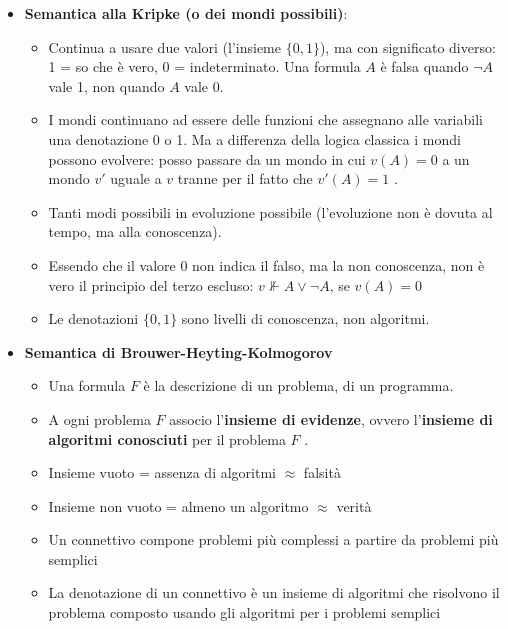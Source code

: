 \documentclass[
  a4paper,
]{article}
\providecommand{\tightlist}{%
  \setlength{\itemsep}{0pt}\setlength{\parskip}{0pt}}
\begin{document}
\begin{itemize}
\item
  \textbf{Semantica alla Kripke (o dei mondi possibili)}:

  \begin{itemize}
  \tightlist
  \item
    Continua a usare due valori (l'insieme \(\{0, 1\}\)), ma con
    significato diverso: 1 = so che è vero, 0 = indeterminato. Una
    formula \(A\) è falsa quando \(\neg A\) vale 1, non quando \(A\)
    vale 0.
  \item
    I mondi continuano ad essere delle funzioni che assegnano alle
    variabili una denotazione 0 o 1. Ma a differenza della logica
    classica i mondi possono evolvere: posso passare da un mondo in cui
    \(v(A) = 0\) a un mondo \(v'\) uguale a \(v\) tranne per il fatto
    che \(v'(A) = 1\) .
  \item
    Tanti modi possibili in evoluzione possibile (l'evoluzione non è
    dovuta al tempo, ma alla conoscenza).
  \item
    Essendo che il valore 0 non indica il falso, ma la non conoscenza,
    non è vero il principio del terzo escluso:
    \(v \not \Vdash A \lor \neg A\), se \(v(A) = 0\)
  \item
    Le denotazioni \(\{0, 1\}\) sono livelli di conoscenza, non
    algoritmi.
  \end{itemize}
\item
  \textbf{Semantica di Brouwer-Heyting-Kolmogorov}

  \begin{itemize}
  \tightlist
  \item
    Una formula \(F\) è la descrizione di un problema, di un programma.
  \item
    A ogni problema \(F\) associo l'\textbf{insieme di evidenze}, ovvero
    l'\textbf{insieme di algoritmi conosciuti} per il problema \(F\) .
  \item
    Insieme vuoto = assenza di algoritmi \(\approx\) falsità
  \item
    Insieme non vuoto = almeno un algoritmo \(\approx\) verità
  \item
    Un connettivo compone problemi più complessi a partire da problemi
    più semplici
  \item
    La denotazione di un connettivo è un insieme di algoritmi che
    risolvono il problema composto usando gli algoritmi per i problemi
    semplici
  \end{itemize}
\end{itemize}
\end{document}
